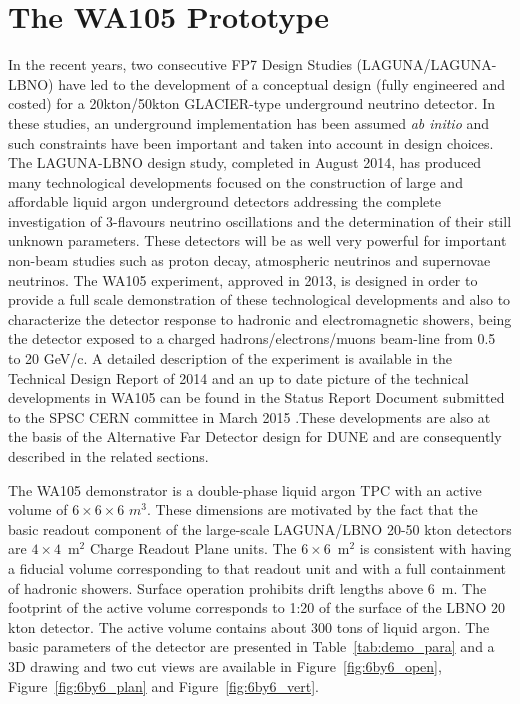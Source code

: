 \section{The WA105 Prototype}
\label{sec:proto-cern-double}

 In the recent years, two consecutive FP7 Design Studies (LAGUNA/LAGUNA-LBNO) have led to the development of a conceptual design (fully engineered and costed) for a 20kton/50kton GLACIER-type underground neutrino detector. In these studies, an underground implementation has been assumed {\it ab initio}
and such constraints have been important and taken into account in design choices. The LAGUNA-LBNO design study, completed in August 2014, has produced many technological developments focused on the construction of  large and affordable liquid argon underground detectors addressing the complete investigation of 3-flavours neutrino oscillations and the determination of their still unknown parameters. These detectors will be as well very powerful for important non-beam studies such as proton decay, atmospheric neutrinos and supernovae neutrinos. The WA105 experiment, approved in 2013, is designed in order to provide a full scale demonstration of these technological developments and also to characterize the detector response to hadronic and electromagnetic showers, being the detector exposed to a charged hadrons/electrons/muons beam-line from 0.5 to 20 GeV/c. A detailed description of the experiment is available in the Technical Design Report of 2014  \cite{WA105_TDR} and an up to date picture of the technical developments in WA105 can be found in the Status Report Document submitted to the SPSC CERN committee in  March 2015 \cite{WA105_SREP}.These developments are also at the basis of the Alternative Far Detector design for DUNE and are consequently described in the related sections.

The WA105 demonstrator is a double-phase liquid argon TPC with an active volume of $6\times 6\times 6$ $m^3$. These dimensions are motivated by the fact that the  basic readout component of the large-scale LAGUNA/LBNO 20-50 kton detectors are $4\times 4$~m$^2$ Charge Readout Plane units.
The $6\times6$~m$^2$ is consistent with having a fiducial volume corresponding to that readout unit and with a full containment of hadronic showers.
Surface operation prohibits drift lengths above 6~m. The footprint of the active volume corresponds to 1:20 of the surface of the LBNO 20 kton detector. The active volume contains about 300 tons of liquid argon. The basic parameters of the detector are presented in Table~\ref{tab:demo_para} and a 3D drawing and two cut views are available in Figure~\ref{fig:6by6_open},  Figure~\ref{fig:6by6_plan} and  Figure~\ref{fig:6by6_vert}.


